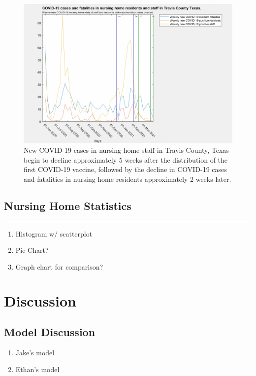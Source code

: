 \documentclass[twoside]{article}
\begin{document}
\begin{multicols}{2}
\begin{figure}[H]
	\includegraphics[width=\linewidth]{images/travis_nursing_home_with_vaccine.png}
	\caption{New COVID-19 cases in nursing home staff in Travis County, Texas begin to decline approximately 5 weeks after the distribution of the first COVID-19 vaccine, followed by the decline in COVID-19 cases and fatalities in nursing home residents approximately 2 weeks later. }
	\label{fig:images/travis_nursing_home_with_vaccineLabel}
\end{figure}

\subsection{Nursing Home Statistics}
\rule{\linewidth}{0.25pt}

\begin{enumerate}
	\item Histogram w/ scatterplot 
	\item Pie Chart?
	\item Graph chart for comparison?
\end{enumerate}


\section{Discussion}

\subsection{Model Discussion}

\begin{enumerate}
	\item Jake's model
	\item Ethan's model
\end{enumerate}



\end{multicols}
\end{document}
